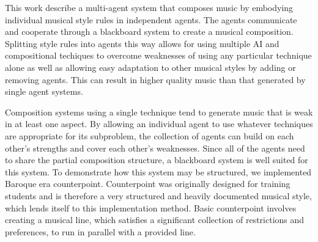 

This work describe a multi-agent system that composes music by embodying individual musical style rules in independent agents.
The agents communicate and cooperate through a blackboard system to create a musical composition.
Splitting style rules into agents this way allows for using multiple AI and compositional techiques to overcome weaknesses of using any particular technique alone
	as well as allowing easy adaptation to other musical styles by adding or removing agents.
This can result in higher quality music than that generated by single agent systems.

Composition systems using a single technique tend to generate music that is weak in at least one aspect.
By allowing an individual agent to use whatever techniques are appropriate for its subproblem, the collection of agents can build on each other's strengths and cover each other's weaknesses.
Since all of the agents need to share the partial composition structure, a blackboard system is well suited for this system.
To demonstrate how this system may be structured, we implemented Baroque era counterpoint.
Counterpoint was originally designed for training students and is therefore a very structured and heavily documented musical style, which lends itself to this implementation method.
Basic counterpoint involves creating a musical line, which satisfies a significant collection of restrictions and preferences, to run in parallel with a provided line.

